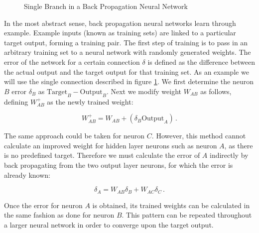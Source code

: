 \begin{figure}[ht]
	\centering
	
	\caption{Single Branch in a Back Propagation Neural Network}
	\label{fig:backprop}
\end{figure}

In the most abstract sense, back propagation neural networks learn through example.  Example inputs (known as training sets) are linked to a particular target output, forming a training pair.  The first step of training is to pass in an arbitrary training set to a neural network with randomly generated weights.  The error of the network for a certain connection $\delta$ is defined as the difference between the actual output and the target output for that training set. As an example we will use the single connection described in figure \ref{fig:backprop}.  We first determine the neuron $B$ error $\delta_B$ as $\text{Target}_B - \text{Output}_B$.   Next we modify weight $W_{AB}$ as follows, defining $W_{AB}^{+}$ as the newly trained weight:

\begin{equation}
	W_{AB}^{+} = W_{AB} + (\delta_B \text{Output}_A)\,.
\end{equation}

The same approach could be taken for neuron $C$.  However, this method cannot calculate an improved weight for hidden layer neurons such as neuron $A$, as there is no predefined target.  Therefore we must calculate the error of $A$ indirectly by back propagating from the two output layer neurons, for which the error is already known:

\begin{equation}
	\delta_A = W_{AB}\delta_B + W_{AC}\delta_C \,.
\end{equation}

Once the error for neuron $A$ is obtained, its trained weights can be calculated in the same fashion as done for neuron $B$.  This pattern can be repeated throughout a larger neural network in order to converge upon the target output.

